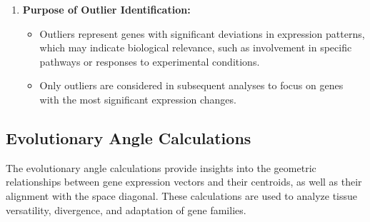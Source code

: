 \documentclass{article}
\begin{document}
\begin{enumerate}
    \item \textbf{Purpose of Outlier Identification:}
    \begin{itemize}
        \item Outliers represent genes with significant deviations in expression patterns, which may indicate biological relevance, such as involvement in specific pathways or responses to experimental conditions.
        \item Only outliers are considered in subsequent analyses to focus on genes with the most significant expression changes.
    \end{itemize}
\end{enumerate}

\subsection{Evolutionary Angle Calculations}
The evolutionary angle calculations provide insights into the geometric relationships between gene expression vectors and their centroids, as well as their alignment with the space diagonal. These calculations are used to analyze tissue versatility, divergence, and adaptation of gene families.
\end{document}
